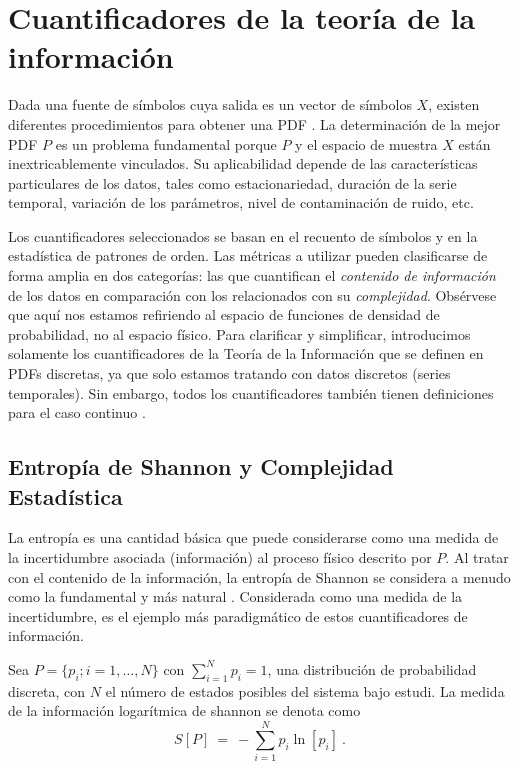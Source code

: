 \section{Cuantificadores de la teoría de la información}
\label{sec:ITQs}

Dada una fuente de símbolos cuya salida es un vector de símbolos $X$, existen diferentes procedimientos para obtener una PDF \cite{Rosso2009, DeMicco2008, Mischaikow1999, Powell1979, Rosso2001, Pompe2002}.
La determinación de la mejor PDF $P$ es un problema fundamental porque $P$ y el espacio de muestra $X$ están inextricablemente vinculados.
Su aplicabilidad depende de las características particulares de los datos, tales como estacionariedad, duración de la serie temporal, variación de los parámetros, nivel de contaminación de ruido, etc.

Los cuantificadores seleccionados se basan en el recuento de símbolos y en la estadística de patrones de orden.
Las métricas a utilizar pueden clasificarse de forma amplia en dos categorías: las que cuantifican el \textit{contenido de información} de los datos en comparación con los relacionados con su \textit{complejidad}.
Obsérvese que aquí nos estamos refiriendo al espacio de funciones de densidad de probabilidad, no al espacio físico.
Para clarificar y simplificar, introducimos solamente los cuantificadores de la Teoría de la Información que se definen en PDFs discretas, ya que solo estamos tratando con datos discretos (series temporales).
Sin embargo, todos los cuantificadores también tienen definiciones para el caso continuo \cite{Shannon1948}.

\subsection{Entropía de Shannon y Complejidad Estadística}

La entropía es una cantidad básica que puede considerarse como una medida de la incertidumbre asociada (información) al proceso físico descrito por $P$.
Al tratar con el contenido de la información, la entropía de Shannon se considera a menudo como la fundamental y más natural \cite{Shannon1948}.
Considerada como una medida de la incertidumbre, es el ejemplo más paradigmático de estos cuantificadores de información.

Sea $P=\{p_i; i=1,\ldots, N\}$ con $\sum_{i=1}^N p_i = 1$, una distribución de probabilidad discreta, con $N$ el número de estados posibles del sistema bajo estudi.
La medida de la información logarítmica de shannon se denota como
\begin{equation}
\label{Shannon-disc}
S[P] ~=~ -\sum_{i=1}^{N} p_i \ln \left[ p_i \right] \ .
\end{equation}

